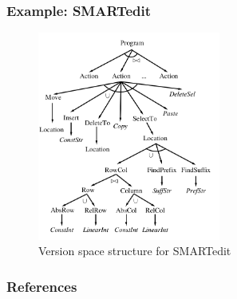 \documentclass{beamer}
\begin{document}
\begin{frame}
\frametitle{Example: SMARTedit}

\begin{figure}[h]
	\centering
	\includegraphics[width=6cm]{smartedit.png}
	\caption{Version space structure for SMARTedit}
\end{figure}

\end{frame}

\begin{frame}[allowframebreaks]
	\frametitle{References}
	
\end{frame}
\end{document}
